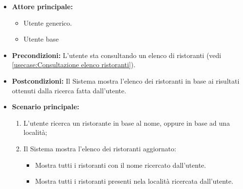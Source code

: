 \label{usecase:Ricerca ristorante}
\begin{itemize}
	\item \textbf{Attore principale:}
    \begin{itemize}
        \item Utente generico.
        \item Utente base
    \end{itemize}
	
	\item \textbf{Precondizioni:} L'utente sta consultando un elenco di ristoranti (vedi \autoref{usecase:Consultazione elenco ristoranti}).

	\item \textbf{Postcondizioni:} Il Sistema mostra l'elenco dei ristoranti in base ai risultati ottenuti dalla ricerca fatta dall'utente.
 
	      
	\item \textbf{Scenario principale:}
	      \begin{enumerate}
		      \item L'utente ricerca un ristorante in base al nome, oppure in base ad una località;

		      \item Il Sistema mostra l'elenco dei ristoranti aggiornato:
		      \begin{itemize}
                \item Mostra tutti i ristoranti con il nome ricercato dall'utente.
                \item Mostra tutti i ristoranti presenti nela località ricercata dall'utente.
              \end{itemize}
	      \end{enumerate}

\end{itemize}


